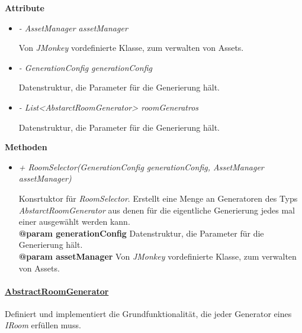             \textbf{Attribute}
            \begin{itemize}
                \item  \textit{- AssetManager assetManager} 
                    \begin{leftbar}[0.9\linewidth]
                        Von \textit{JMonkey} vordefinierte Klasse, zum verwalten von Assets.
                    \end{leftbar}
                
                \item  \textit{- GenerationConfig generationConfig} 
                    \begin{leftbar}[0.9\linewidth]
                        Datenstruktur, die Parameter für die Generierung hält.
                    \end{leftbar}
                
                    \item  \textit{- List<AbstarctRoomGenerator> roomGeneratros} 
                    \begin{leftbar}[0.9\linewidth]
                        Datenstruktur, die Parameter für die Generierung hält.
                    \end{leftbar}
            \end{itemize}

            \textbf{Methoden}					
            \begin{itemize}
                \item  \textit{+ RoomSelector(GenerationConfig generationConfig, AssetManager assetManager)}
                    \begin{leftbar}[0.9\linewidth]
                        Konsrtuktor für \textit{RoomSelector}. Erstellt eine Menge an Generatoren des Typs \textit{AbstarctRoomGenerator} 
                        aus denen für die eigentliche Generierung jedes mal einer ausgewählt werden kann.\\
                        \textbf{@param generationConfig} Datenstruktur, die Parameter für die Generierung hält.\\
                        \textbf{@param assetManager} Von \textit{JMonkey} vordefinierte Klasse, zum verwalten von Assets.
                    \end{leftbar}   
            \end{itemize}
            
        
        
        \paragraph{\underline{AbstractRoomGenerator}} \mbox{}\par
            Definiert und implementiert die Grundfunktionalität, die jeder Generator eines \textit{IRoom} erfüllen muss.\par
            
